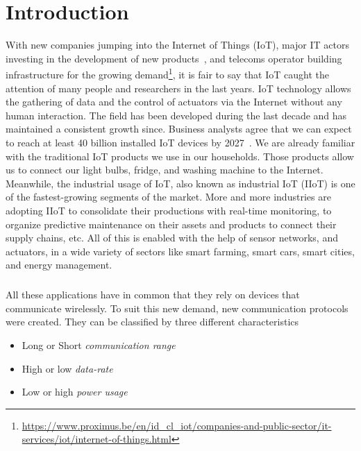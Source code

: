 \chapter{Introduction}

With new companies jumping into the Internet of Things (IoT), 
major IT actors investing in the development of new
products~\cite{fortuneiot2019}, and telecoms operator building infrastructure 
for the growing
demand\footnote{\url{https://www.proximus.be/en/id_cl_iot/companies-and-public-sector/it-services/iot/internet-of-things.html}},
it is fair to say that IoT caught the attention of many people and researchers
in the last years.
IoT technology allows the gathering of data and the control of actuators via
the Internet without any human interaction.
The field has been developed during the last decade and has maintained a
consistent growth since.
Business analysts agree that we can expect to reach at least 40 billion
installed IoT devices by 2027~\cite{businessinsider2020}.
We are already familiar with the traditional IoT products
we use in our households. Those products allow us to connect our light bulbs,
fridge, and washing machine to the Internet.
Meanwhile, the industrial usage of IoT, also known as industrial IoT (IIoT) is
one of the fastest-growing segments of the market.
More and more industries are adopting IIoT to consolidate their productions
with real-time monitoring, to organize predictive maintenance on their
assets and products to connect their supply chains, etc.
All of this is enabled with the help of sensor networks, and actuators, in a
wide variety of sectors like smart farming, smart cars,
smart cities, and energy management.

\paragraph{}

All these applications have in common that they rely on devices that
communicate wirelessly.
To suit this new demand, new communication protocols were created.
They can be classified by three different characteristics

\begin{itemize}
    \item Long or Short \emph{communication range}
    \item High or low \emph{data-rate}
    \item Low or high \emph{power usage} 
\end{itemize}

